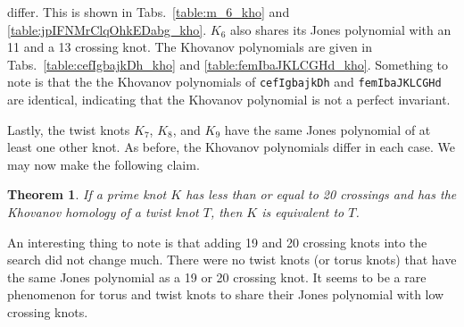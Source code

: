 \documentclass{article}
\theoremstyle{plain}
\newtheorem{theorem}{Theorem}
\begin{document}
        differ. This is shown in
        Tabs.~\ref{table:m_6_kho} and \ref{table:jpIFNMrClqOhkEDabg_kho}.
        $K_{6}$ also shares its Jones polynomial with an 11 and a 13 crossing
        knot. The Khovanov polynomials are given in
        Tabs.~\ref{table:cefIgbajkDh_kho} and
        \ref{table:femIbaJKLCGHd_kho}. Something to note is that the
        the Khovanov polynomials of \texttt{cefIgbajkDh} and
        \texttt{femIbaJKLCGHd} are identical, indicating that the
        Khovanov polynomial is not a perfect invariant.
        \par\hfill\par
        Lastly, the twist knots $K_{7}$, $K_{8}$, and $K_{9}$ have the same
        Jones polynomial of at least one other knot. As before, the Khovanov
        polynomials differ in each case. We may now make the following claim.
        \begin{theorem}
            If a prime knot $K$ has less than or equal to 20 crossings and has
            the Khovanov homology of a twist knot $T$,
            then $K$ is equivalent to $T$.
        \end{theorem}
        An interesting thing to note is that adding 19 and 20 crossing knots
        into the search did not change much. There were no twist knots
        (or torus knots) that have the same Jones polynomial as a 19 or 20
        crossing knot. It seems to be a rare phenomenon for torus and twist
        knots to share their Jones polynomial with low crossing knots.
\end{document}
